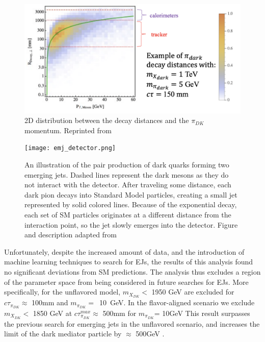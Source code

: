 \begin{figure}
	\centering
	\includegraphics[width=.75\linewidth]{Images/Decay-distances-emj.png}
	\caption[2D distributions of decay distances and $\pi_{DK}$ momentum]{2D distribution between the decay distances and the $\pi_{DK}$ momentum. Reprinted from \cite{Schwaller:2015gea}}
	\label{fig:decay-distance}
\end{figure}



\begin{figure}
	\centering
	\texttt{[image: emj\_detector.png]}
	\caption[Illustration of the emerging jets forming in a detector]{An illustration of the pair production of dark quarks forming two emerging jets. Dashed lines represent the dark mesons as they do not interact with the detector. After traveling some distance, each dark pion decays into Standard Model particles, creating a small jet represented by solid colored lines. Because of the exponential decay, each set of SM particles originates at a different distance from the interaction point, so the jet slowly emerges into the detector. Figure and description adapted from \cite{Schwaller:2015gea}}
	\label{fig:2emj_inCMS}
\end{figure}

Unfortunately, despite the increased amount of data, and the introduction of machine learning techniques to search for EJs, the results of this analysis found no significant deviations from SM predictions.
The analysis thus excludes a region of the parameter space from being considered in future searches for EJs. More specifically, for the unflavored model, $m_{X_{DK}} <$  1950 GeV are excluded for $c\tau_{\pi_{DK}} \approx$ 100mm and $m_{\pi_{DK}}=$~10~GeV. In the flavor-aligned scenario we exclude $m_{X_{DK}} <$  1850 GeV at $c\tau^{max}_{\pi_{DK}} \approx$ 500mm for $m_{\pi_{DK}}$= 10GeV
This result surpasses the previous search for emerging jets in the unflavored scenario, and increases the limit of the dark mediator particle by $\approx$ 500GeV  \cite{CMS:2024gxp}.



